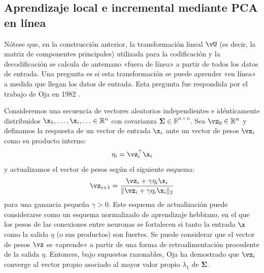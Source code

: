 \documentclass[../../book-main.tex]{subfiles}
\begin{document}
\subsection{Aprendizaje local e incremental mediante PCA en línea}
Nótese que, en la construcción anterior, la transformación lineal $\vU$ 
(es decir, la matriz de componentes principales) utilizada para la 
codificación y la decodificación se calcula de antemano
«fuera de línea» a partir de todos los datos de entrada. Una pregunta 
es si esta transformación se puede aprender «en línea» a medida que 
llegan los datos de entrada. Esta pregunta fue respondida por el 
trabajo de Oja en 1982 \cite{Oja1982SimplifiedNM}.
\begin{example} Consideremos una
    secuencia de vectores aleatorios independientes e idénticamente distribuidos 
    $\x_1, \ldots, \x_i, \ldots \in \mathbb{R}^n$ con covarianza $\boldsymbol{\Sigma} \in
    \mathbb{R}^{n\times n}$. Sea $\vz_0 \in \mathbb{R}^n$ y definamos
    la respuesta de un vector de entrada $\x_i$ ante un vector de pesos
    $\vz_i$ como su producto interno:
    \begin{equation}
        \eta_i = \vz_i^\top \x_i
    \end{equation}
    y actualizamos el vector de pesos según el siguiente esquema:
    \begin{equation}
        \vz_{i+1} = \frac{\vz_i + \gamma \eta_i \x_i}{\|\vz_i + \gamma
        \eta_i \x_i\|_2}
        \label{eqn:Hebbian}
    \end{equation}
    para una ganancia pequeña $\gamma > 0$. Este esquema de actualización puede considerarse
    como un esquema normalizado de aprendizaje hebbiano, en el que los pesos de las conexiones
    entre neuronas se fortalecen si tanto la entrada $\x$ como la salida $\eta$ 
    (o sus productos) son fuertes. Se puede considerar que el vector de
    pesos $\vz$ se «aprende» a partir de una forma de retroalimentación procedente de la
    salida $\eta$.
    Entonces, bajo supuestos razonables, Oja \cite{Oja1982SimplifiedNM} ha
    demostrado que $\vz_i$ converge al vector propio asociado al
    mayor valor propio $\lambda_1$ de $\boldsymbol{\Sigma}$.
\end{example}
\end{document}
